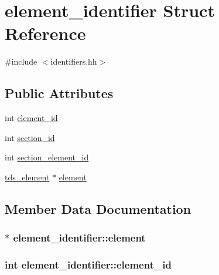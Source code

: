 \hypertarget{structelement__identifier}{}\section{element\+\_\+identifier Struct Reference}
\label{structelement__identifier}


{\ttfamily \#include $<$identifiers.\+hh$>$}

\subsection*{Public Attributes}
\begin{DoxyCompactItemize}
\item 
int \hyperlink{structelement__identifier_a177cd08fd67204a84c9ab045cbbef706}{element\+\_\+id}
\item 
int \hyperlink{structelement__identifier_a28ecafe70b469746ec1a4e2d58511637}{section\+\_\+id}
\item 
int \hyperlink{structelement__identifier_a8f54674a7794f520435a7c9cc13057e9}{section\+\_\+element\+\_\+id}
\item 
\hyperlink{classtds__element}{tds\+\_\+element} $\ast$ \hyperlink{structelement__identifier_a0c60a4998b53560e3be639cbda2c51d0}{element}
\end{DoxyCompactItemize}


\subsection{Member Data Documentation}
\subsubsection[{\texorpdfstring{element}{element}}]{$\ast$ element\+\_\+identifier\+::element}\hypertarget{structelement__identifier_a0c60a4998b53560e3be639cbda2c51d0}{}\label{structelement__identifier_a0c60a4998b53560e3be639cbda2c51d0}
\subsubsection[{\texorpdfstring{element\+\_\+id}{element_id}}]{\setlength{\rightskip}{0pt plus 5cm}int element\+\_\+identifier\+::element\+\_\+id}\hypertarget{structelement__identifier_a177cd08fd67204a84c9ab045cbbef706}{}\label{structelement__identifier_a177cd08fd67204a84c9ab045cbbef706}
